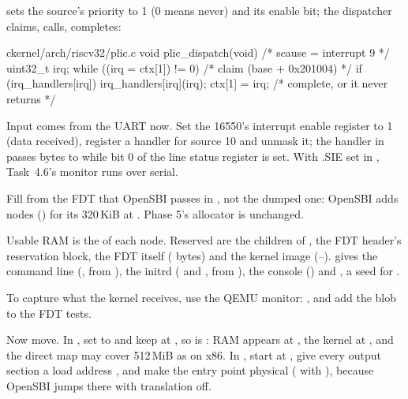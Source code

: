 \documentclass[11pt,a4paper]{article}
\begin{document}
 sets the source's priority to 1 (0 means never) and its enable bit; the dispatcher
claims, calls, completes:

\begin{lst}{c}{kernel/arch/riscv32/plic.c}
void plic_dispatch(void)                            /* scause = interrupt 9           */
{
    uint32_t irq;
    while ((irq = ctx[1]) != 0) {                   /* claim (base + 0x201004)        */
        if (irq_handlers[irq])
            irq_handlers[irq](irq);
        ctx[1] = irq;                               /* complete, or it never returns  */
    }
}
\end{lst}

Input comes from the UART now. Set the 16550's interrupt enable register to 1 (data received), register a handler
for source 10 and unmask it; the handler in  passes bytes to  while bit 0 of
the line status register is set. With .SIE set in , Task~4.6's monitor runs over serial.

Fill  from the FDT that OpenSBI passes in , not the dumped one: OpenSBI adds
 nodes () for its 320\,KiB at . Phase 5's allocator is unchanged.

Usable RAM is the  of each  node. Reserved are the children of ,
the FDT header's reservation block, the FDT itself ( bytes) and the kernel image
(--).  gives the command line (, from
), the initrd ( and , from ), the console
() and , a seed for .

To capture what the kernel receives, use the QEMU monitor: , and add
the blob to the FDT tests.

Now move. In , set  to  and keep  at
, so  is : RAM appears at , the
kernel at , and the direct map may cover 512\,MiB as on x86. In , start at
, give every output section a load address , and make the entry point
physical ( with ), because OpenSBI jumps there with
translation off.
\end{document}
